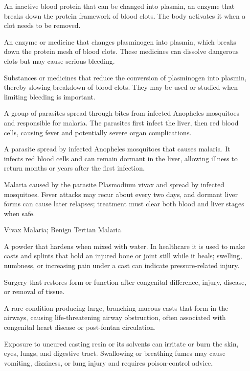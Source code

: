  An inactive blood protein that can be changed into plasmin, an enzyme that breaks down the protein framework of blood clots. The body activates it when a clot needs to be removed.

 An enzyme or medicine that changes plasminogen into plasmin, which breaks down the protein mesh of blood clots. These medicines can dissolve dangerous clots but may cause serious bleeding.

 Substances or medicines that reduce the conversion of plasminogen into plasmin, thereby slowing breakdown of blood clots. They may be used or studied when limiting bleeding is important.

 A group of parasites spread through bites from infected Anopheles mosquitoes and responsible for malaria. The parasites first infect the liver, then red blood cells, causing fever and potentially severe organ complications.

 A parasite spread by infected Anopheles mosquitoes that causes malaria. It infects red blood cells and can remain dormant in the liver, allowing illness to return months or years after the first infection.

 Malaria caused by the parasite Plasmodium vivax and spread by infected mosquitoes. Fever attacks may recur about every two days, and dormant liver forms can cause later relapses; treatment must clear both blood and liver stages when safe.

\synonyms
Vivax Malaria; Benign Tertian Malaria

 A powder that hardens when mixed with water. In healthcare it is used to make casts and splints that hold an injured bone or joint still while it heals; swelling, numbness, or increasing pain under a cast can indicate pressure-related injury.

 Surgery that restores form or function after congenital difference, injury, disease, or removal of tissue.

 A rare condition producing large, branching mucous casts that form in the airways,
causing life-threatening airway obstruction, often associated with congenital heart
disease or post-fontan circulation.

 Exposure to uncured casting resin or its solvents can irritate or burn the skin, eyes, lungs, and digestive tract. Swallowing or breathing fumes may cause vomiting, dizziness, or lung injury and requires poison-control advice.

